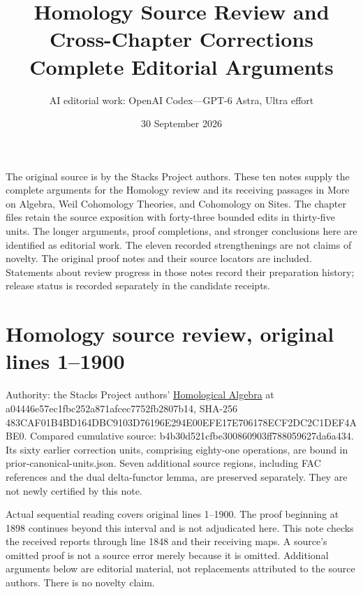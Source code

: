 \documentclass[11pt]{article}
\title{Homology Source Review and Cross-Chapter Corrections\\Complete Editorial Arguments}
\author{AI editorial work: OpenAI Codex---GPT-6 Astra, Ultra effort}
\date{30 September 2026}
\begin{document}
\maketitle
\noindent
The original source is by the Stacks Project authors. These ten notes
supply the complete arguments for the Homology review and its receiving
passages in More on Algebra, Weil Cohomology Theories, and Cohomology on
Sites. The chapter files retain the source exposition with forty-three
bounded edits in thirty-five units. The longer arguments, proof
completions, and stronger conclusions here are identified as editorial
work. The eleven recorded strengthenings are not claims of novelty.
The original proof notes and their source locators are included. Statements
about review progress in those notes record their preparation history;
release status is recorded separately in the candidate receipts.
\setcounter{secnumdepth}{1}
\tableofcontents
\section{Homology source review, original lines 1--1900}\label{note-01-homology-source-review-original-lines-11900}

Authority: the Stacks Project authors' \href{https://github.com/stacks/stacks-project/blob/a04446e5\allowbreak{}7ec1fbc2\allowbreak{}52a871af\allowbreak{}cec7752f\allowbreak{}b2807b14/homology.tex}{Homological Algebra} at a04446e5\allowbreak{}7ec1fbc2\allowbreak{}52a871af\allowbreak{}cec7752f\allowbreak{}b2807b14, SHA-256 483CAF01\allowbreak{}B4BD164D\allowbreak{}BC9103D7\allowbreak{}6196E294\allowbreak{}E00EFE17\allowbreak{}E706178E\allowbreak{}CF2DC2C1\allowbreak{}DEF4ABE0. Compared cumulative source: b4b30d52\allowbreak{}1cfbe300\allowbreak{}860903ff\allowbreak{}78805962\allowbreak{}7da6a434. Its sixty earlier correction units, comprising eighty-one operations, are bound in prior-canonical-units.json. Seven additional source regions, including FAC references and the dual delta-functor lemma, are preserved separately. They are not newly certified by this note.

Actual sequential reading covers original lines 1--1900. The proof beginning at 1898 continues beyond this interval and is not adjudicated here. This note checks the received reports through line 1848 and their receiving maps. A source's omitted proof is not a source error merely because it is omitted. Additional arguments below are editorial material, not replacements attributed to the source authors. There is no novelty claim.
\end{document}
